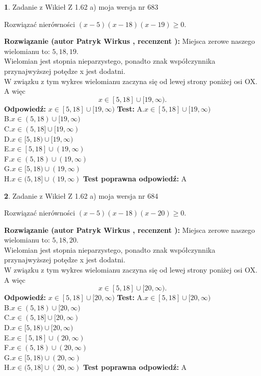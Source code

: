 \documentclass[12pt, a4paper]{article}
\theoremstyle{definition} %
\newtheorem{zad}{}
\newcommand{\zadStart}[1]{\begin{zad}#1\newline}
\newcommand{\zadStop}{\end{zad}}
\newcommand{\rozwStart}[2]{\noindent \textbf{Rozwiązanie (autor #1 , recenzent #2): }\newline}
\newcommand{\rozwStop}{\newline}
\newcommand{\odpStart}{\noindent \textbf{Odpowiedź:}\newline}
\newcommand{\odpStop}{\newline}
\newcommand{\testStart}{\noindent \textbf{Test:}\newline}
\newcommand{\testStop}{\newline}
\newcommand{\kluczStart}{\noindent \textbf{Test poprawna odpowiedź:}\newline}
\newcommand{\kluczStop}{\newline}
\begin{document}
\zadStart{Zadanie z Wikieł Z 1.62 a) moja wersja nr 683}

Rozwiązać nierówności $(x-5)(x-18)(x-19)\ge0$.
\zadStop
\rozwStart{Patryk Wirkus}{}
Miejsca zerowe naszego wielomianu to: $5, 18, 19$.\\
Wielomian jest stopnia nieparzystego, ponadto znak współczynnika przy\linebreak najwyższej potędze x jest dodatni.\\ W związku z tym wykres wielomianu zaczyna się od lewej strony poniżej osi OX. A więc $$x \in [5,18] \cup [19,\infty).$$
\rozwStop
\odpStart
$x \in [5,18] \cup [19,\infty)$
\odpStop
\testStart
A.$x \in [5,18] \cup [19,\infty)$\\
B.$x \in (5,18) \cup [19,\infty)$\\
C.$x \in (5,18] \cup [19,\infty)$\\
D.$x \in [5,18) \cup [19,\infty)$\\
E.$x \in [5,18] \cup (19,\infty)$\\
F.$x \in (5,18) \cup (19,\infty)$\\
G.$x \in [5,18) \cup (19,\infty)$\\
H.$x \in (5,18] \cup (19,\infty)$
\testStop
\kluczStart
A
\kluczStop



\zadStart{Zadanie z Wikieł Z 1.62 a) moja wersja nr 684}

Rozwiązać nierówności $(x-5)(x-18)(x-20)\ge0$.
\zadStop
\rozwStart{Patryk Wirkus}{}
Miejsca zerowe naszego wielomianu to: $5, 18, 20$.\\
Wielomian jest stopnia nieparzystego, ponadto znak współczynnika przy\linebreak najwyższej potędze x jest dodatni.\\ W związku z tym wykres wielomianu zaczyna się od lewej strony poniżej osi OX. A więc $$x \in [5,18] \cup [20,\infty).$$
\rozwStop
\odpStart
$x \in [5,18] \cup [20,\infty)$
\odpStop
\testStart
A.$x \in [5,18] \cup [20,\infty)$\\
B.$x \in (5,18) \cup [20,\infty)$\\
C.$x \in (5,18] \cup [20,\infty)$\\
D.$x \in [5,18) \cup [20,\infty)$\\
E.$x \in [5,18] \cup (20,\infty)$\\
F.$x \in (5,18) \cup (20,\infty)$\\
G.$x \in [5,18) \cup (20,\infty)$\\
H.$x \in (5,18] \cup (20,\infty)$
\testStop
\kluczStart
A
\kluczStop
\end{document}
